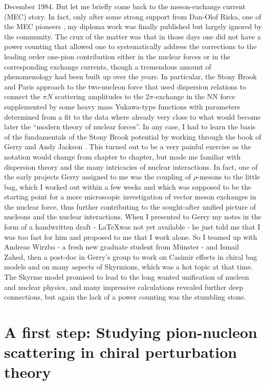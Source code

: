 \documentclass[a4paper,fleqn]{scrartcl}
\begin{document}
December 1984. But let me briefly come back to the meson-exchange current
(MEC) story. In fact, only after some strong support from Dan-Olof Riska, one
of the MEC pioneers \cite{RB}, my diploma work was finally published
\cite{Meissner:1983wn} but largely ignored by the community. The crux of the 
matter was that in those days one did not have a power counting that allowed
one to systematically address the corrections to the leading order one-pion
contribution either in the nuclear forces or in the corresponding exchange 
currents, though a tremendous amount of phenomenology had been built up
over the years. In particular, the Stony Brook and Paris approach to the
two-nucleon force that used dispersion relations to connect the $\pi N$ 
scattering amplitudes to the $2\pi$-exchange in the NN force supplemented
by some heavy mass Yukawa-type functions with parameters determined from
a fit to the data where already very close to what would become later the
``modern theory of nuclear forces''. In any case, I had to learn the
basis of the fundamentals of the Stony Brook potential by working through
the book of Gerry and Andy Jackson \cite{BJbook}. This turned out to be 
a very painful exercise as the notation would change from chapter to chapter,
but made me familiar with dispersion theory and the many intricacies of nuclear
interactions. In fact, one of the early projects Gerry assigned to me was
the coupling of $\rho$-mesons to the little bag, which I worked out within
a few weeks and which was supposed to be the starting point for a more
microscopic investigation of vector meson exchanges in the nuclear force, thus
further contributing to the sought-after unified picture of nucleons and 
the nuclear interactions.
When I presented to Gerry my notes in the form of a handwritten draft -
\LaTeX was not yet available - he just told me that I was too fast for him and
proposed to me that I work alone.  So I  teamed up with Andreas Wirzba - a fresh
new graduate student from M\"unster - and Ismail Zahed, then a post-doc in
Gerry's group to work on Casimir effects in chiral bag models and on many
aspects of Skyrmions, which was a hot topic at that time. The
Skyrme model promised to lead to the long wanted unification of nucleon
and nuclear physics, and many impressive calculations revealed further
deep connections, but again the lack of a power counting was the stumbling
stone. 


\section{A first step: Studying pion-nucleon scattering in chiral
perturbation theory}
\end{document}
